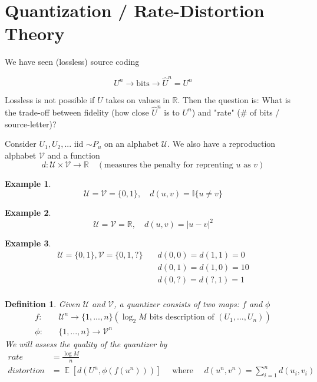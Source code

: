 \documentclass{article}
\newtheorem{definition}{Definition}[section]
\theoremstyle{definition} %
\newtheorem{example}{Example}
\def\V{\mathcal{V}}
\def\U{\mathcal{U}}
\def\R{\mathbb{R}}
\def\I{\mathbb{I}}
\DeclareMathOperator{\E}{\mathbb{E}}%
\begin{document}

\section{Quantization / Rate-Distortion Theory}

We have seen (lossless) source coding

\[
  U^n \rightarrow \text{bits} \rightarrow \hat{U}^n = U^n
\]

Lossless is not possible if $U$ takes on values in $\R$. Then the question is: What is the trade-off between fidelity (how close $\hat{U}^n$ is to $U^n$) and "rate" ($\#$ of bits / source-letter)?

Consider $U_1, U_2, ...$ iid $\sim P_u$ on an alphabet $\U$. We also have a reproduction alphabet $\V$ and a function 
\[
  d: \U \times \V \rightarrow \R \quad (\text{measures the penalty for reprenting } u \text{ as } v) 
\]

\begin{example}
  \[ 
    \U = \V = \{ 0, 1 \}, \quad d(u,v) = \I\{u \neq v\}
  \]
\end{example}

\begin{example}
  \[ 
    \U = \V = \R, \quad d(u,v) = |u - v|^2
  \]
\end{example}

\begin{example}
  \begin{align*}
    \U = \{0, 1\}, \V = \{ 0, 1, ? \} \quad & d(0,0) = d(1,1) = 0 \\
                                            & d(0,1) = d(1,0) = 10 \\
                                            & d(0,?) = d(?,1) = 1 \\
  \end{align*}
\end{example}

\begin{definition}
  Given $\U$ and $\V$, a quantizer consists of two maps: $f$ and $\phi$ 
  \begin{align*}
    f: & \quad \U^n \rightarrow \{ 1, ..., n \} (\log_2 M \text{ bits description of } (U_1, ..., U_n)) \\
    \phi: & \quad \{1, ..., n \} \rightarrow \V^n
  \end{align*}
  We will assess the quality of the quantizer by 
  \begin{align*}
    rate &= \frac{\log M}{n} \\
    distortion &= \E[d(U^n, \phi(f(u^n)))] \quad \text{ where } \quad d(u^n, v^n) = \sum_{i = 1}^n d(u_i, v_i) 
  \end{align*}
\end{definition}
\end{document}
